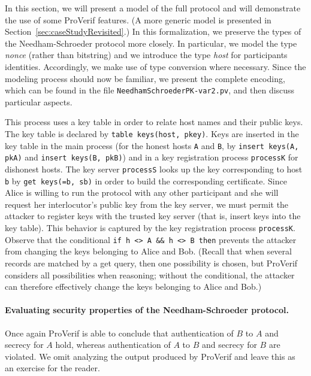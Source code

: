 \documentclass{book}
\newcommand{\A}{A}
\newcommand{\B}{B}
\begin{document}
In this section, we will present a model of the full protocol and will demonstrate the use of some ProVerif features. (A more generic model is presented in Section~\ref{sec:caseStudyRevisited}.)
In this formalization, we preserve the types of the Needham-Schroeder protocol more closely. In particular, we model the type \emph{nonce} (rather than bitstring) and we introduce the type \emph{host} for participants identities. Accordingly, we make use of type conversion where necessary. Since the modeling process should now be familiar, we present the complete encoding, which can be found in the file \texttt{{\docexdir}NeedhamSchroederPK-var2.pv}, and then discuss particular aspects.
%

%
This process uses a key table in order to relate host names and their public keys. The key table is declared by \lstinline!table keys(host, pkey)!. Keys are inserted in the key table in the main process (for the honest hosts \lstinline!A! and \lstinline!B!, by \lstinline!insert keys(A, pkA)! and \lstinline!insert keys(B, pkB)!) and in a key registration process \lstinline!processK! for dishonest hosts. The key server \lstinline!processS! looks up the key corresponding to host \lstinline!b! by \lstinline!get keys(=b, sb)! in order to build the corresponding certificate.
%
Since Alice is willing to run the protocol with any other participant and she will request her interlocutor's public key from the key server, we must permit the attacker to register keys with the trusted key server (that is, insert keys into the key table). This behavior is captured by the key registration process \lstinline!processK!. Observe that the conditional \lstinline!if h <> A && h <> B then! prevents the attacker from changing the keys belonging to Alice and Bob. (Recall that when several records are matched by a get query, then one possibility is chosen, but ProVerif considers all possibilities when reasoning; without the conditional, the attacker can therefore effectively change the keys belonging to Alice and Bob.)


\paragraph{Evaluating security properties of the Needham-Schroeder protocol.} Once again ProVerif is able to conclude that authentication of $\B$ to $\A$ and secrecy for $\A$ hold, whereas authentication of $\A$ to $\B$ and secrecy for $\B$ are violated. We omit analyzing the output produced by ProVerif and leave this as an exercise for the reader.
\end{document}
